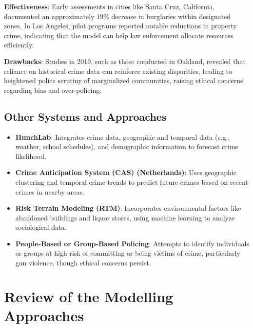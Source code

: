 \documentclass{article}
\begin{document}
\textbf{Effectiveness}: Early assessments in cities like Santa Cruz, California, documented an approximately 19\% decrease in burglaries within designated zones. In Los Angeles, pilot programs reported notable reductions in property crime, indicating that the model can help law enforcement allocate resources efficiently.

\textbf{Drawbacks}: Studies in 2019, such as those conducted in Oakland, revealed that reliance on historical crime data can reinforce existing disparities, leading to heightened police scrutiny of marginalized communities, raising ethical concerns regarding bias and over-policing.

\subsection{Other Systems and Approaches}
\begin{itemize}
    \item \textbf{HunchLab}: Integrates crime data, geographic and temporal data (e.g., weather, school schedules), and demographic information to forecast crime likelihood.
    \item \textbf{Crime Anticipation System (CAS) (Netherlands)}: Uses geographic clustering and temporal crime trends to predict future crimes based on recent crimes in nearby areas.
    \item \textbf{Risk Terrain Modeling (RTM)}: Incorporates environmental factors like abandoned buildings and liquor stores, using machine learning to analyze sociological data.
    \item \textbf{People-Based or Group-Based Policing}: Attempts to identify individuals or groups at high risk of committing or being victims of crime, particularly gun violence, though ethical concerns persist.
\end{itemize}

\section{Review of the Modelling Approaches}
\end{document}
